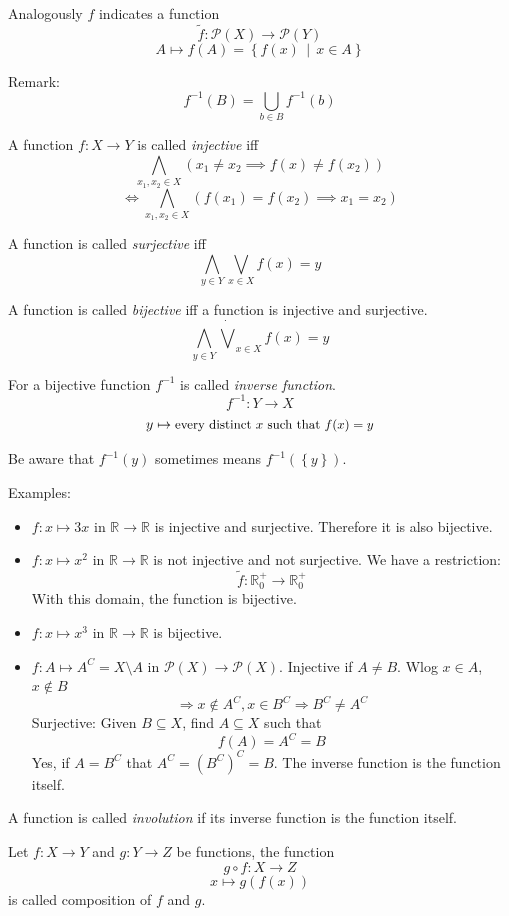 \documentclass[a4paper,landscape,twocolumn]{article}
\newcommand\set[1]{\left\{#1\right\}}
\newcommand\setdef[2]{\left\{#1\,\middle|\,#2\right\}}
\begin{document}
Analogously $f$ indicates a function
\[ \tilde f: \mathcal{P}(X) \rightarrow \mathcal{P}(Y) \]
\[ A \mapsto f(A) = \setdef{f(x)}{x \in A} \]

Remark:
\[ f^{-1}(B) = \bigcup_{b \in B} f^{-1}(b) \]

A function $f: X \rightarrow Y$ is called \emph{injective} iff
\[ \bigwedge_{x_1,x_2 \in X} (x_1 \neq x_2 \implies f(x) \neq f(x_2)) \]
\[ \iff \bigwedge_{x_1,x_2 \in X} (f(x_1) = f(x_2) \implies x_1 = x_2) \]

A function is called \emph{surjective} iff
\[ \bigwedge_{y \in Y} \bigvee_{x \in X} f(x) = y \]

A function is called \emph{bijective} iff a function is injective and surjective.
\[ \bigwedge_{y \in Y} \dot\bigvee_{x \in X} f(x) = y \]

For a bijective function $f^{-1}$ is called \emph{inverse function}.
\[ f^{-1}: Y \rightarrow X \]
\[ y \mapsto \text{\small every distinct $x$ such that $f(x) = y$} \]

Be aware that $f^{-1}(y)$ sometimes means $f^{-1}(\set{y})$.

Examples:
\begin{itemize}
  \item
    $f: x \mapsto 3x$ in $\mathbb{R} \rightarrow \mathbb{R}$ is injective and surjective.
    Therefore it is also bijective.
  \item
    $f: x \mapsto x^2$ in $\mathbb{R} \rightarrow \mathbb{R}$ is not injective and not surjective.
    We have a restriction:
    \[ \tilde f: \mathbb{R}_0^+ \rightarrow \mathbb{R}_0^+ \]
    With this domain, the function is bijective.
  \item
    $f: x \mapsto x^3$ in $\mathbb{R} \rightarrow \mathbb{R}$ is bijective.
  \item
    $f: A \mapsto A^C = X \setminus A$ in $\mathcal{P}(X) \rightarrow \mathcal{P}(X)$.
    Injective if $A \neq B$. Wlog $x \in A$, $x \not\in B$
    \[ \Rightarrow x \notin A^C, x \in B^C \Rightarrow B^C \neq A^C \]
    Surjective: Given $B \subseteq X$, find $A \subseteq X$ such that
    \[ f(A) = A^C = B \]
    Yes, if $A = B^C$ that $A^C = (B^C)^C = B$.
    The inverse function is the function itself.
\end{itemize}

A function is called \emph{involution} if its inverse function is the function itself.

Let $f: X \rightarrow Y$ and $g: Y \rightarrow Z$ be functions, the function
\[ g \circ f: X \rightarrow Z\]
\[ x \mapsto g(f(x)) \]
is called composition of $f$ and $g$.
\end{document}
